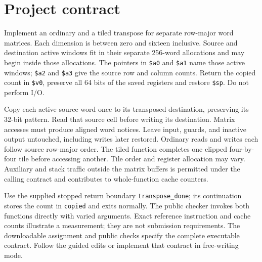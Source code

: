 \section*{Project contract}
Implement an ordinary and a tiled transpose for separate row-major word matrices.
Each dimension is between zero and sixteen inclusive. Source and destination active
windows fit in their separate 256-word allocations and may begin inside those
allocations. The pointers in \texttt{\$a0} and \texttt{\$a1} name those active
windows; \texttt{\$a2} and \texttt{\$a3} give the source row and column counts.
Return the copied count in \texttt{\$v0}, preserve all 64 bits of the saved registers
and restore \texttt{\$sp}. Do not perform I/O.

Copy each active source word once to its transposed destination, preserving its
32-bit pattern. Read that source cell before writing its destination. Matrix
accesses must produce aligned word notices. Leave input, guards, and inactive
output untouched, including writes later restored. Ordinary reads and writes each
follow source row-major order. The tiled function completes one clipped four-by-four
tile before accessing another. Tile order and register allocation may vary.
Auxiliary and stack traffic outside the matrix buffers is permitted under the
calling contract and contributes to whole-function cache counters.

Use the supplied stopped return boundary \texttt{transpose\_done}; its continuation
stores the count in \texttt{copied} and exits normally. The public checker invokes
both functions directly with varied arguments. Exact reference instruction and
cache counts illustrate a measurement; they are not submission requirements.
The downloadable assignment and public checks specify the complete executable
contract. Follow the guided edits or implement that contract in free-writing mode.
